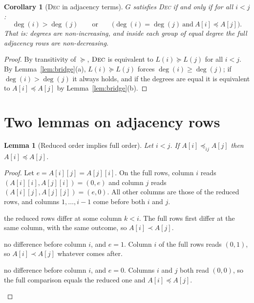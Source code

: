 \documentclass[11pt,a4paper]{article}
\newtheorem{lemma}[theorem]{Lemma}
\newtheorem{corollary}[theorem]{Corollary}
\theoremstyle{definition}
\theoremstyle{remark}
\newcommand{\lex}{\preceq}
\newcommand{\slex}{\prec}
\newcommand{\Lst}{L}
\newcommand{\red}[2]{\mathrel{\preceq_{#1#2}}}
\begin{document}
\begin{corollary}[\textsc{Dec} in adjacency terms]\label{cor:dec}
$G$ satisfies \textsc{Dec} if and only if for all $i<j$:
\[
  \deg(i)>\deg(j)
  \qquad\text{or}\qquad
  \bigl(\deg(i)=\deg(j)\ \text{and}\ A[i]\lex A[j]\bigr).
\]
That is: degrees are non-increasing, and inside each group of equal degree the full adjacency
rows are non-decreasing.
\end{corollary}

\begin{proof}
By transitivity of $\succeq$, $\textsc{Dec}$ is equivalent to $\Lst(i)\succeq\Lst(j)$ for all
$i<j$. By Lemma~\ref{lem:bridge}(a), $\Lst(i)\succeq\Lst(j)$ forces $\deg(i)\ge\deg(j)$; if
$\deg(i)>\deg(j)$ it always holds, and if the degrees are equal it is equivalent to
$A[i]\lex A[j]$ by Lemma~\ref{lem:bridge}(b).
\end{proof}

\section{Two lemmas on adjacency rows}

\begin{lemma}[Reduced order implies full order]\label{lem:reduced}
Let $i<j$. If $A[i]\red ij A[j]$ then $A[i]\lex A[j]$.
\end{lemma}

\begin{proof}
Let $e=A[i][j]=A[j][i]$. On the full rows, column $i$ reads $(A[i][i],A[j][i])=(0,e)$ and
column $j$ reads $(A[i][j],A[j][j])=(e,0)$. All other columns are those of the reduced rows,
and columns $1,\dots,i-1$ come before both $i$ and $j$.
\begin{description}[leftmargin=1.5em]
  \item[Case 1:] the reduced rows differ at some column $k<i$. The full rows first differ at
  the same column, with the same outcome, so $A[i]\slex A[j]$.
  \item[Case 2:] no difference before column $i$, and $e=1$. Column $i$ of the full rows reads
  $(0,1)$, so $A[i]\slex A[j]$ whatever comes after.
  \item[Case 3:] no difference before column $i$, and $e=0$. Columns $i$ and $j$ both read
  $(0,0)$, so the full comparison equals the reduced one and $A[i]\lex A[j]$.\qedhere
\end{description}
\end{proof}
\end{document}
